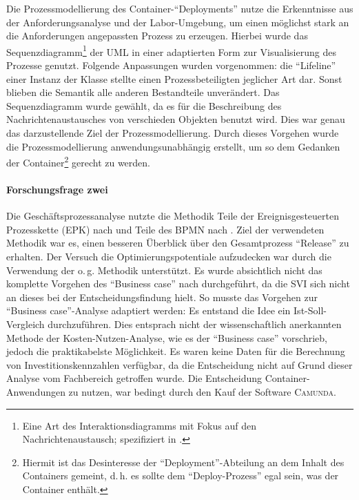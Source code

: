 Die Prozessmodellierung des Container-\enquote{Deployments} nutze die Erkenntnisse aus der Anforderungsanalyse und der Labor-Umgebung, um einen möglichst stark an die Anforderungen angepassten Prozess zu erzeugen. Hierbei wurde das Sequenzdiagramm\footnote{Eine Art des Interaktionsdiagramms mit Fokus auf den Nachrichtenaustausch; spezifiziert in \cite[][S.\,595-599]{object_management_group_omg_unified_2017}.} der \ac{UML} in einer adaptierten Form zur Visualisierung des Prozesse genutzt. Folgende Anpassungen wurden vorgenommen: die \enquote{Lifeline} einer Instanz der Klasse stellte einen Prozessbeteiligten jeglicher Art dar. Sonst blieben die Semantik alle anderen Bestandteile unverändert. Das Sequenzdiagramm wurde gewählt, da es für die Beschreibung des Nachrichtenaustausches von verschieden Objekten benutzt wird. Dies war genau das darzustellende Ziel der Prozessmodellierung. Durch dieses Vorgehen wurde die Prozessmodellierung anwendungsunabhängig erstellt, um so dem Gedanken der Container\footnote{Hiermit ist das Desinteresse der \enquote{Deployment}-Abteilung an dem Inhalt des Containers gemeint, d.\,h. es sollte dem  \enquote{Deploy-Prozess} egal sein, was der Container enthält.} gerecht zu werden. 

\paragraph{Forschungsfrage zwei}
Die Geschäftsprozessanalyse nutzte die Methodik Teile der Ereignisgesteuerten Prozesskette (\acs{EPK}) nach \cite{scheer_objektorientierte_1997} und Teile des \ac{BPMN} nach \cite{object_management_group_omg_business_2011}. Ziel der verwendeten Methodik war es, einen besseren Überblick über den Gesamtprozess \enquote{Release} zu erhalten. Der Versuch die Optimierungspotentiale aufzudecken war durch die Verwendung der o.\,g. Methodik unterstützt. Es wurde absichtlich nicht das komplette Vorgehen des \enquote{Business case} nach \cite{brugger_it_2009} durchgeführt, da die \ac{SVI} sich nicht an dieses bei der Entscheidungsfindung hielt. So musste das Vorgehen zur \enquote{Business case}-Analyse adaptiert werden: Es entstand die Idee ein Ist-Soll-Vergleich durchzuführen. Dies entsprach nicht der wissenschaftlich anerkannten Methode der Kosten-Nutzen-Analyse, wie es der \enquote{Business case} vorschrieb, jedoch die praktikabelste Möglichkeit. Es waren keine Daten für die Berechnung von Investitionskennzahlen verfügbar, da die Entscheidung nicht auf Grund dieser Analyse vom Fachbereich getroffen wurde. Die Entscheidung Container-Anwendungen zu nutzen, war bedingt durch den Kauf der Software \textsc{Camunda}. 

